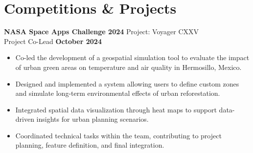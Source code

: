 \documentclass[11pt]{article}
\begin{document}
\section*{Competitions \& Projects}
\textbf{NASA Space Apps Challenge 2024} \hfill Project: Voyager CXXV\\
Project Co-Lead \hfill \textbf{October 2024}
\vspace{-0.3cm}
\begin{itemize}[leftmargin=*]
    \item Co-led the development of a geospatial simulation tool to evaluate the impact of urban green areas on temperature and air quality in Hermosillo, Mexico.
    
    \vspace{-0.3cm}
    \item Designed and implemented a system allowing users to define custom zones and simulate long-term environmental effects of urban reforestation.
    
    \vspace{-0.3cm}
    \item Integrated spatial data visualization through heat maps to support data-driven insights for urban planning scenarios.
    
    \vspace{-0.3cm}
    \item Coordinated technical tasks within the team, contributing to project planning, feature definition, and final integration.
\end{itemize}
\end{document}
